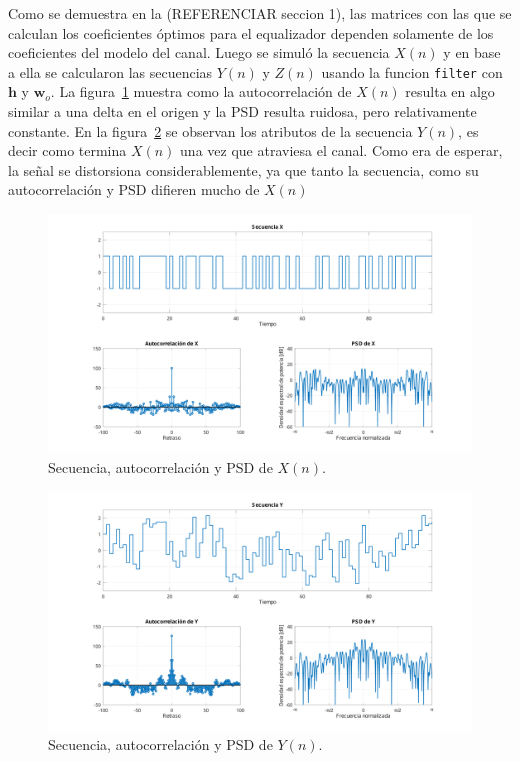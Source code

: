 Como se demuestra en la (REFERENCIAR seccion 1), las matrices con las que se calculan los coeficientes óptimos para el equalizador dependen solamente de los coeficientes del modelo del canal. Luego se simuló la secuencia $X(n)$ y en base a ella se calcularon las secuencias $Y(n)$ y $Z(n)$ usando la funcion \verb*|filter| con $\textbf{h}$ y $\textbf{w}_o$. La figura~\ref{fig:ej3_x} muestra como la autocorrelación de $X(n)$ resulta en algo similar a una delta en el origen y la PSD resulta ruidosa, pero relativamente constante. En la figura~\ref{fig:ej3_y} se observan los atributos de la secuencia $Y(n)$, es decir como termina $X(n)$ una vez que atraviesa el canal. Como era de esperar, la señal se distorsiona considerablemente, ya que tanto la secuencia, como su autocorrelación y PSD difieren mucho de $X(n)$

\begin{figure}[h]
	\centering
	\includegraphics[width=1\linewidth]{img/ej3_x.pdf}
	\caption{Secuencia, autocorrelación y PSD de $X(n)$.}
	\label{fig:ej3_x}
\end{figure}

\begin{figure}[h]
	\centering
	\includegraphics[width=1\linewidth]{img/ej3_y.pdf}
	\caption{Secuencia, autocorrelación y PSD de $Y(n)$.}
	\label{fig:ej3_y}
\end{figure}

